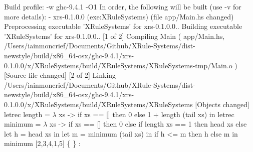 Build profile: -w ghc-9.4.1 -O1
In order, the following will be built (use -v for more details):
 - xrs-0.1.0.0 (exe:XRuleSystems) (file app/Main.hs changed)
Preprocessing executable 'XRuleSystems' for xrs-0.1.0.0..
Building executable 'XRuleSystems' for xrs-0.1.0.0..
[1 of 2] Compiling Main             ( app/Main.hs, /Users/iainmoncrief/Documents/Github/XRule-Systems/dist-newstyle/build/x86_64-osx/ghc-9.4.1/xrs-0.1.0.0/x/XRuleSystems/build/XRuleSystems/XRuleSystems-tmp/Main.o ) [Source file changed]
[2 of 2] Linking /Users/iainmoncrief/Documents/Github/XRule-Systems/dist-newstyle/build/x86_64-osx/ghc-9.4.1/xrs-0.1.0.0/x/XRuleSystems/build/XRuleSystems/XRuleSystems [Objects changed]
letrec length = $\lambda$ xs -> if xs == [] then 0 else 1 + length (tail xs) in letrec minimum = $\lambda$ xs -> if xs == [] then 0 else if length xs == 1 then head xs else let h = head xs in let m = minimum (tail xs) in if h <= m then h else m in minimum [2,3,4,1,5]
\{  \} :  \Rightarrow {}
